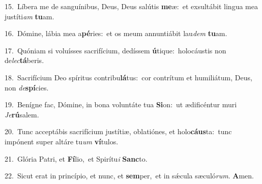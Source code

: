 {\numbfont\textcolor{\numbcolor}{15.}}~Líbera me de sanguínibus, Deus, Deus salútis \textbf{me}\-æ:~\star et exsultábit lingua mea justíti\textit{am} \textbf{tu}\-am.\par
{\numbfont\textcolor{\numbcolor}{16.}}~Dómine, lábia mea a\-\textbf{pé}\-ries:~\star et os meum annuntiábit lau\textit{dem} \textbf{tu}\-am.\par
{\numbfont\textcolor{\numbcolor}{17.}}~Quóniam si voluísses sacrifícium, dedíssem \textbf{ú}\-tique:~\star holocáustis non de\-\textit{lec}\-\textbf{tá}beris.\par
{\numbfont\textcolor{\numbcolor}{18.}}~Sacrifícium Deo spíritus contribu\-\textbf{lá}\-tus:~\star cor contrítum et humiliátum, Deus, non \textit{de}\-\textbf{spí}cies.\par
{\numbfont\textcolor{\numbcolor}{19.}}~Benígne fac, Dómine, in bona voluntáte tua \textbf{Si}\-on:~\star ut ædificéntur muri \textit{Je}\-\textbf{rú}salem.\par
{\numbfont\textcolor{\numbcolor}{20.}}~Tunc acceptábis sacrifícium justítiæ, oblatiónes, et holo\-\textbf{cáus}\-ta:~\star tunc impónent super altáre tu\textit{um} \textbf{ví}\-tulos.\par
{\numbfont\textcolor{\numbcolor}{21.}}~Glória Patri, et \textbf{Fí}\-lio,~\star et Spirítu\textit{i} \textbf{Sanc}\-to.\par
{\numbfont\textcolor{\numbcolor}{22.}}~Sicut erat in princípio, et nunc, et \textbf{sem}\-per,~\star et in sǽcula sæculó\-\textit{rum}\-. \textbf{A}\-men.\par

